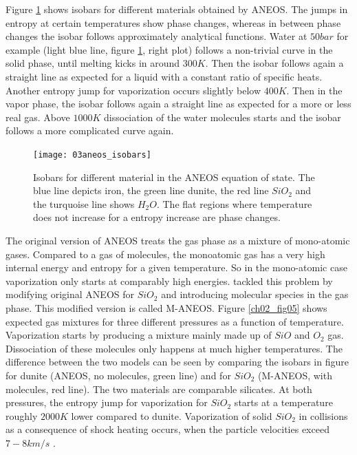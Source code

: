 Figure \ref{ch02_fig03} shows isobars for different materials obtained by ANEOS. The jumps in entropy at certain temperatures show phase changes, whereas in between phase changes the isobar follows approximately analytical functions. Water at $50bar$ for example (light blue line, figure \ref{ch02_fig03}, right plot) follows a non-trivial curve in the solid phase, until melting kicks in around $300K$. Then the isobar follows again a straight line as expected for a liquid with a constant ratio of specific heats. Another entropy jump for vaporization occurs slightly below $400K$. Then in the vapor phase, the isobar follows again a straight line as expected for a more or less real gas. Above $1000K$ dissociation of the water molecules starts and the isobar follows a more complicated curve again.

\begin{figure}
\begin{center}
\texttt{[image: 03aneos\_isobars]}
\caption{Isobars for different material in the ANEOS equation of state. The blue line depicts iron, the green line dunite, the red line $SiO_2$ and the turquoise line shows $H_2 O$. The flat regions where temperature does not increase for a entropy increase are phase changes. }
\label{ch02_fig03}
\end{center}
\end{figure}

The original version of ANEOS treats the gas phase as a mixture of mono-atomic gases. Compared to a gas of molecules, the monoatomic gas has a very high internal energy and entropy for a given temperature. So in the mono-atomic case vaporization only starts at comparably high energies. \cite{Melosh:2007p3502} tackled this problem by modifying original ANEOS for $SiO_2$ and introducing molecular species in the gas phase. This modified version is called M-ANEOS. Figure \ref{ch02_fig05} shows expected gas mixtures for three different pressures as a function of temperature. Vaporization starts by producing a mixture mainly made up of $SiO$ and $O_2$ gas. Dissociation of these molecules only happens at much higher temperatures. The difference between the two models can be seen by comparing the isobars in figure for dunite (ANEOS, no molecules, green line) and for $SiO_2$ (M-ANEOS, with molecules, red line). The two materials are comparable silicates. At both pressures, the entropy jump for vaporization for $SiO_2$ starts at a temperature roughly $2000K$ lower compared to dunite. Vaporization of solid $SiO_2$ in collisions as a consequence of shock heating occurs, when the particle velocities exceed $7-8km/s$ \citep{Melosh:2007p3502}.

